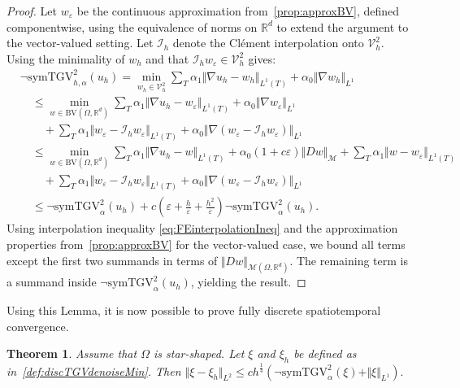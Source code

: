 \documentclass{article}
\newcommand{\R}{\mathbb{R}}
\newcommand{\NSymTGV}{\neg \mathrm{symTGV}}
\newcommand{\BV}{\mathrm{BV}}
\newtheorem{theorem}{Theorem}[section]
\begin{document}
	\begin{proof}
		Let $w_\varepsilon$ be the continuous approximation from~\cref{prop:approxBV}, defined componentwise, using the equivalence of norms on $\R^d$ to extend the argument to the vector-valued setting.
		Let $\mathcal{I}_h$ denote the Clément interpolation onto $\mathcal{V}_h^2$.
		Using the minimality of $w_h$ and that $\mathcal{I}_hw_\varepsilon\in\mathcal{V}_h^2 $ gives:
		\begin{align*}
			&\NSymTGV_{h,\alpha}^2(u_{h}) = \min_{w_h\in \mathcal{V}_h^2} \sum_T \alpha_1 \Vert \nabla u_h - w_h\Vert_{L^1(T)} + \alpha_0\Vert  \nabla w_h\Vert_{L^1} \\
			&\quad\leq \min_{w\in \BV(\Omega, \R^d)} \sum_T \alpha_1 \Vert \nabla u_h - w_\varepsilon\Vert_{L^1(T)} + \alpha_0\Vert  \nabla w_\varepsilon\Vert_{L^1}\\
			& \qquad + \sum_T \alpha_1 \Vert w_\varepsilon - \mathcal{I}_hw_\varepsilon\Vert_{L^1(T)} + \alpha_0\Vert \nabla(w_\varepsilon - \mathcal{I}_h w_\varepsilon)\Vert_{L^1}\\
			&\quad\leq \min_{w\in \BV(\Omega, \R^d)} \sum_T \alpha_1 \Vert \nabla u_h - w\Vert_{L^1(T)} + \alpha_0 (1+c \varepsilon)\Vert D w\Vert_{\mathcal{M}}+ \sum_T \alpha_1 \Vert w - w_\varepsilon\Vert_{L^1(T)}\\
			&\qquad + \sum_T \alpha_1 \Vert w_\varepsilon - \mathcal{I}_hw_\varepsilon\Vert_{L^1(T)} + \alpha_0\Vert \nabla(w_\varepsilon - \mathcal{I}_h w_\varepsilon)\Vert_{L^1}\\
			&\quad \leq \NSymTGV_{\alpha}^2(u_{h}) + c(\varepsilon + \frac{h}{\varepsilon} + \frac{h^2}{\varepsilon})\NSymTGV_{\alpha}^2(u_{h}).
		\end{align*}
		Using interpolation inequality \eqref{eq:FEinterpolationIneq} and the approximation properties from~\cref{prop:approxBV} for the vector-valued case, we bound all terms except the first two summands in terms of $\Vert Dw\Vert_{\mathcal{M}(\Omega, \R^d)}$.
		The remaining term is a summand inside $\NSymTGV_\alpha^2(u_h)$, yielding the result.
	\end{proof}
	Using this Lemma, it is now possible to prove fully discrete spatiotemporal convergence.
	\begin{theorem}
		\label{thm:full_discrete_conv}
		Assume that $\Omega$ is star-shaped. Let $\xi$ and $\xi_{h}$ be defined as in~\cref{def:discTGVdenoiseMin}. Then
		$
		\Vert \xi - \xi_{h}\Vert_{L^2} \leq ch^{\frac{1}{4}}\left(\NSymTGV^2_{\alpha}(\xi) + \Vert \xi\Vert_{L^1}\right).
		$
	\end{theorem}
\end{document}
